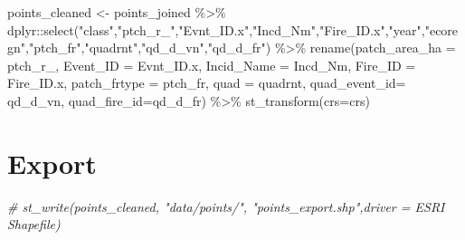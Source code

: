 \documentclass[
]{book}
\newenvironment{Shaded}{\begin{snugshade}}{\end{snugshade}}
\newcommand{\AttributeTok}[1]{\textcolor[rgb]{0.77,0.63,0.00}{#1}}
\newcommand{\CommentTok}[1]{\textcolor[rgb]{0.56,0.35,0.01}{\textit{#1}}}
\newcommand{\FunctionTok}[1]{\textcolor[rgb]{0.00,0.00,0.00}{#1}}
\newcommand{\NormalTok}[1]{#1}
\newcommand{\OtherTok}[1]{\textcolor[rgb]{0.56,0.35,0.01}{#1}}
\newcommand{\SpecialCharTok}[1]{\textcolor[rgb]{0.00,0.00,0.00}{#1}}
\newcommand{\StringTok}[1]{\textcolor[rgb]{0.31,0.60,0.02}{#1}}
\begin{document}
\begin{Shaded}
\begin{Highlighting}[]
\NormalTok{points\_cleaned }\OtherTok{\textless{}{-}}\NormalTok{ points\_joined }\SpecialCharTok{\%\textgreater{}\%} 
\NormalTok{  dplyr}\SpecialCharTok{::}\FunctionTok{select}\NormalTok{(}\StringTok{"class"}\NormalTok{,}\StringTok{"ptch\_r\_"}\NormalTok{,}\StringTok{"Evnt\_ID.x"}\NormalTok{,}\StringTok{"Incd\_Nm"}\NormalTok{,}\StringTok{"Fire\_ID.x"}\NormalTok{,}\StringTok{"year"}\NormalTok{,}\StringTok{"ecoregn"}\NormalTok{,}\StringTok{"ptch\_fr"}\NormalTok{,}\StringTok{"quadrnt"}\NormalTok{,}\StringTok{"qd\_d\_vn"}\NormalTok{,}\StringTok{"qd\_d\_fr"}\NormalTok{) }\SpecialCharTok{\%\textgreater{}\%} 
  \FunctionTok{rename}\NormalTok{(}\AttributeTok{patch\_area\_ha =}\NormalTok{ ptch\_r\_,}
         \AttributeTok{Event\_ID =}\NormalTok{ Evnt\_ID.x,}
         \AttributeTok{Incid\_Name =}\NormalTok{ Incd\_Nm,}
         \AttributeTok{Fire\_ID =}\NormalTok{ Fire\_ID.x,}
         \AttributeTok{patch\_frtype =}\NormalTok{ ptch\_fr,}
         \AttributeTok{quad =}\NormalTok{ quadrnt,}
         \AttributeTok{quad\_event\_id=}\NormalTok{ qd\_d\_vn,}
         \AttributeTok{quad\_fire\_id=}\NormalTok{qd\_d\_fr) }\SpecialCharTok{\%\textgreater{}\%} 
  \FunctionTok{st\_transform}\NormalTok{(}\AttributeTok{crs=}\NormalTok{crs)}
\end{Highlighting}
\end{Shaded}

\hypertarget{export-1}{%
\section{Export}\label{export-1}}

\begin{Shaded}
\begin{Highlighting}[]
\CommentTok{\# st\_write(points\_cleaned, "data/points/", "points\_export.shp",driver = \textquotesingle{}ESRI Shapefile\textquotesingle{})}
\end{Highlighting}
\end{Shaded}


  
\end{document}

